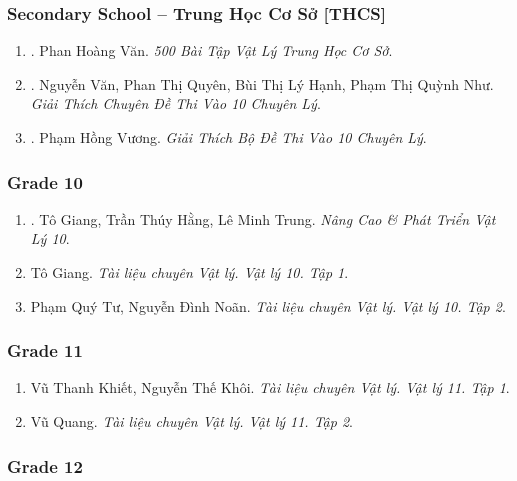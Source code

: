 \documentclass{article}
\begin{document}
\subsubsection{Secondary School -- Trung Học Cơ Sở [THCS]}

\begin{enumerate}
	\item \cite{Van_500_BT_Vat_Ly_THCS}. Phan Hoàng Văn. \textit{500 Bài Tập Vật Lý Trung Học Cơ Sở}.\hfill{\sf[reading]}
	\item \cite{Van_Quyen_Hanh_Nhu_10_chuyen_Ly}. Nguyễn Văn, Phan Thị Quyên, Bùi Thị Lý Hạnh, Phạm Thị Quỳnh Như. \textit{Giải Thích Chuyên Đề Thi Vào 10 Chuyên Lý}.\hfill{\sf[reading]}
	\item \cite{Vuong_10_chuyen_Ly}. Phạm Hồng Vương. \textit{Giải Thích Bộ Đề Thi Vào 10 Chuyên Lý}.\hfill{\sf[reading]}
\end{enumerate}

\subsubsection{Grade 10}

\begin{enumerate}
	\item \cite{Giang_Hang_Trung2022}. Tô Giang, Trần Thúy Hằng, Lê Minh Trung. \textit{Nâng Cao \& Phát Triển Vật Lý 10}.\hfill{\sf[reading]}
	\item Tô Giang. \textit{Tài liệu chuyên Vật lý. Vật lý 10. Tập 1}.
	\item Phạm Quý Tư, Nguyễn Đình Noãn. \textit{Tài liệu chuyên Vật lý. Vật lý 10. Tập 2}.
\end{enumerate}

\subsubsection{Grade 11}

\begin{enumerate}
	\item Vũ Thanh Khiết, Nguyễn Thế Khôi. \textit{Tài liệu chuyên Vật lý. Vật lý 11. Tập 1}.
	\item Vũ Quang. \textit{Tài liệu chuyên Vật lý. Vật lý 11. Tập 2}.
\end{enumerate}

\subsubsection{Grade 12}
\end{document}
